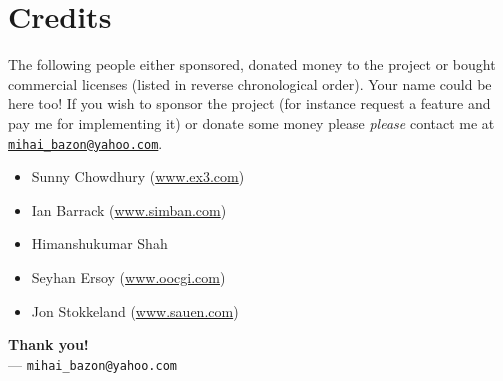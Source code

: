 \documentclass[a4paper,twoside,10pt]{dynadoc}
\begin{document}
\section{Credits}

The following people either sponsored, donated money to the project or bought
commercial licenses (listed in reverse chronological order).  Your name could
be here too!  If you wish to sponsor the project (for instance request a
feature and pay me for implementing it) or donate some money please
\emph{please} contact me at \texttt{\href{mailto:mihai\_bazon@yahoo.com}{mihai\_bazon@yahoo.com}}.

\begin{itemize}

  \item Sunny Chowdhury ({\href{http://www.ex3.com}{www.ex3.com}})

  \item Ian Barrack ({\href{http://www.simban.com}{www.simban.com}})

  \item Himanshukumar Shah

  \item Seyhan Ersoy ({\href{http://www.oocgi.com}{www.oocgi.com}})

  \item Jon Stokkeland ({\href{http://www.sauen.com}{www.sauen.com}})

\end{itemize}

\begin{flushright}
\textbf{Thank you!}\\
--- \texttt{mihai\_bazon@yahoo.com}
\end{flushright}
\end{document}
